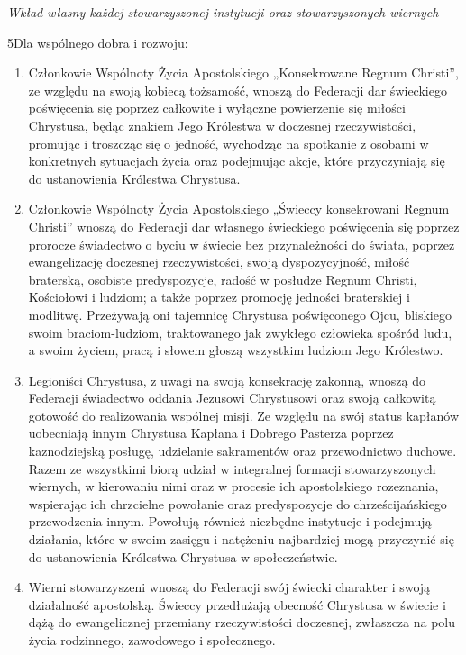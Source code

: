 ﻿\documentclass{book}
\newcommand{\lett}[1]{\lettrine[findent=6pt]{#1}}
\newcommand{\ssec}[1]{\vspace{1em}\textit{#1}\vspace{.5em}\nopagebreak}
\begin{document}
\ssec{Wkład własny każdej stowarzyszonej instytucji oraz stowarzyszonych wiernych}


\lett{5} Dla wspólnego dobra i rozwoju:


\begin{enumerate}


\item Członkowie Wspólnoty Życia Apostolskiego „Konsekrowane Regnum Christi”, ze względu na swoją kobiecą tożsamość, wnoszą do Federacji dar świeckiego poświęcenia się poprzez całkowite i wyłączne powierzenie się miłości Chrystusa, będąc znakiem Jego Królestwa w doczesnej rzeczywistości, promując i troszcząc się o jedność, wychodząc na spotkanie z osobami w konkretnych sytuacjach życia oraz podejmując akcje, które przyczyniają się do ustanowienia Królestwa Chrystusa.


\item Członkowie Wspólnoty Życia Apostolskiego „Świeccy konsekrowani Regnum Christi” wnoszą do Federacji dar własnego świeckiego poświęcenia się  poprzez prorocze świadectwo o byciu w świecie bez przynależności do świata, poprzez ewangelizację doczesnej rzeczywistości, swoją dyspozycyjność, miłość braterską, osobiste predyspozycje, radość w posłudze Regnum Christi, Kościołowi i ludziom; a także poprzez promocję jedności braterskiej i modlitwę. Przeżywają oni tajemnicę Chrystusa poświęconego Ojcu, bliskiego swoim braciom-ludziom, traktowanego jak zwykłego człowieka spośród ludu, a swoim życiem, pracą i słowem głoszą wszystkim ludziom Jego Królestwo.


\item Legioniści Chrystusa, z uwagi na swoją konsekrację zakonną, wnoszą do Federacji świadectwo oddania Jezusowi Chrystusowi oraz swoją całkowitą gotowość do realizowania wspólnej misji. Ze względu na swój status kapłanów uobecniają innym Chrystusa Kapłana i Dobrego Pasterza poprzez kaznodziejską posługę, udzielanie sakramentów oraz przewodnictwo duchowe. Razem ze wszystkimi biorą udział w integralnej formacji stowarzyszonych wiernych, w kierowaniu nimi oraz w procesie ich apostolskiego rozeznania, wspierając ich chrzcielne powołanie oraz predyspozycje do chrześcijańskiego przewodzenia innym. Powołują również niezbędne instytucje i podejmują działania, które w swoim zasięgu i natężeniu najbardziej mogą przyczynić się do ustanowienia Królestwa Chrystusa w społeczeństwie.


\item Wierni stowarzyszeni wnoszą do Federacji swój świecki charakter i swoją działalność apostolską. Świeccy przedłużają obecność Chrystusa w świecie i dążą do ewangelicznej przemiany rzeczywistości doczesnej, zwłaszcza na polu życia rodzinnego, zawodowego i społecznego.


\end{enumerate}
\end{document}
